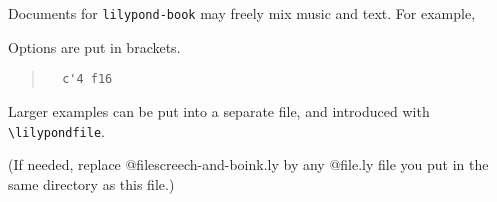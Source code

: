 \documentclass[a5paper]{article}
\begin{document}
Documents for \verb+lilypond-book+ may freely mix music and text.
For example,

{%
\parindent 0pt
\noindent
\ifx\preLilyPondExample \undefined
\else
  \expandafter\preLilyPondExample
\fi
\def\lilypondbook{}%

\ifx\postLilyPondExample \undefined
\else
  \expandafter\postLilyPondExample
\fi
}

Options are put in brackets.

\begin{quote}
\noindent
\begin{verbatim}
  c'4 f16
\end{verbatim}
{%
\parindent 0pt
\noindent
\ifx\preLilyPondExample \undefined
\else
  \expandafter\preLilyPondExample
\fi
\def\lilypondbook{}%

\ifx\postLilyPondExample \undefined
\else
  \expandafter\postLilyPondExample
\fi
}
\end{quote}

Larger examples can be put into a separate file, and introduced with
\verb+\lilypondfile+.

\begin{quote}
{%
\parindent 0pt
\noindent
\ifx\preLilyPondExample \undefined
\else
  \expandafter\preLilyPondExample
\fi
\def\lilypondbook{}%

\ifx\postLilyPondExample \undefined
\else
  \expandafter\postLilyPondExample
\fi
}
\end{quote}

(If needed, replace @file{screech-and-boink.ly} by any @file{.ly} file
you put in the same directory as this file.)
\end{document}
